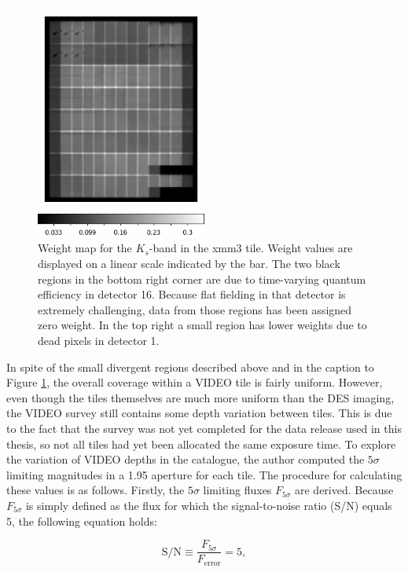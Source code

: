 \begin{figure}[!tb] 
\centering    
\includegraphics[width=0.5\textwidth]{Chapter2/Figs/xmm3_Ks_weights.png}
\caption[Example weight map]{Weight map for the $K_{s}$-band in the xmm3 tile. Weight values are displayed on a linear scale indicated by the bar. The two black regions in the bottom right corner are due to time-varying quantum efficiency in detector 16. Because flat fielding in that detector is extremely challenging, data from those regions has been assigned zero weight. In the top right a small region has lower weights due to dead pixels in detector 1.}
\label{fig:weight_map}
\end{figure}




In spite of the small divergent regions described above and in the caption to Figure \ref{fig:weight_map}, the overall coverage within a VIDEO tile is fairly uniform. However, even though the tiles themselves are much more uniform than the DES imaging, the VIDEO survey still contains some depth variation between tiles. This is due to the fact that the survey was not yet completed for the data release used in this thesis, so not all tiles had yet been allocated the same exposure time. To explore the variation of VIDEO depths in the \DESVIDEO catalogue, the author computed the $5\sigma$ limiting magnitudes in a \SI{1.95}{\arcsec} aperture for each tile. The procedure for calculating these values is as follows. Firstly, the $5\sigma$ limiting fluxes $F_{5\sigma}$ are derived. Because $F_{5\sigma}$ is simply defined as the flux for which the signal-to-noise ratio (S/N) equals 5, the following equation holds:


\begin{equation}
\mathrm{S/N} \equiv \frac{F_{5\sigma}}{F_{\mathrm{error}}} = 5,\label{eqn:video_signal_noise}
\end{equation}

